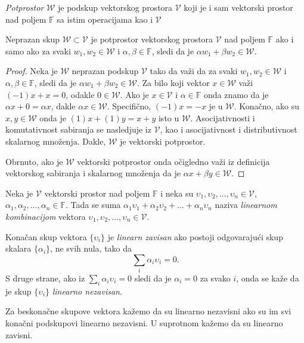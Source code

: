 \documentclass{article}
\begin{document}
\begin{definition}
  \textit{Potprostor} $\mathcal{W}$ je podskup vektorskog prostora $\mathcal{V}$ koji je i sam vektorski prostor nad poljem $\mathbb{F}$ sa istim operacijama kao i $\mathcal{V}$
\end{definition}

\begin{theorem}
  Neprazan skup $\mathcal{W} \subset \mathcal{V}$ je potprostor vektorskog prostora $\mathcal{V}$ nad poljem $\mathbb{F}$ ako i samo ako za svaki $w_1, w_2 \in \mathcal{W}$ i $\alpha, \beta \in \mathbb{F}$, sledi da je $\alpha w_1 + \beta w_2 \in \mathcal{W}$.
\end{theorem}

\begin{proof}
  Neka je $\mathcal{W}$ neprazan podskup $\mathcal{V}$ tako da važi da za svaki $w_1, w_2 \in \mathcal{W}$ i $\alpha, \beta \in \mathbb{F}$, sledi da je $\alpha w_1 + \beta w_2 \in \mathcal{W}$.
  Za bilo koji vektor $x \in \mathcal{W}$ važi $(-1) x + x = 0$, odakle $0 \in \mathcal{W}$.
  Ako je $x \in \mathcal{V}$ i $\alpha \in \mathbb{F}$ onda znamo da je $\alpha x + 0 = \alpha x$, dakle $\alpha x \in \mathcal{W}$.
  Specifično, $(-1) x = -x$ je u $\mathcal{W}$.
  Konačno, ako su $x, y \in \mathcal{W}$ onda je $(1) x + (1) y = x + y$ isto u $\mathcal{W}$.
  Asocijativnosti i komutativnost sabiranja se nasledjuje iz $\mathcal{V}$, kao i asocijativnost i distributivnost skalarnog množenja.
  Dakle, $\mathcal{W}$ je vektorski potprostor.

  Obrnuto, ako je $\mathcal{W}$ vektorski potprostor onda očigledno važi iz definicija vektorskog sabiranja i skalarnog množenja da je $\alpha x + \beta y \in \mathcal{W}$.
\end{proof}

\begin{definition}
  Neka je $\mathcal{V}$ vektorski prostor nad poljem $\mathbb{F}$ i neka su $\upsilon_1, \upsilon_2, \ldots, \upsilon_n \in \mathcal{V}$, $\alpha_1, \alpha_2, \ldots, \alpha_n \in \mathbb{F}$.
  Tada se suma $\alpha_1 \upsilon_1 + \alpha_2 \upsilon_2 + \ldots + \alpha_n \upsilon_n$ naziva \textit{linearnom kombinacijom} vektora $\upsilon_1, \upsilon_2, \ldots, \upsilon_n \in \mathcal{V}$.
\end{definition}

\begin{definition}
  Konačan skup vektora $\{\upsilon_i\}$ je \textit{linearn zavisan} ako postoji odgovarajući skup skalara $\{\alpha_i\}$, ne svih nula, tako da
  \[\sum_{i} \alpha_i \upsilon_i = 0.\]
  S druge strane, ako iz $\sum_{i} \alpha_i \upsilon_i = 0$ sledi da je $\alpha_i = 0$ za svako $i$, onda se kaže da je skup $\{\upsilon_i\}$ \textit{linearno nezavisan}.
  
  Za beskonačne skupove vektora kažemo da su linearno nezavisni ako su im svi konačni podskupovi linearno nezavisni.
  U suprotnom kažemo da su linearno zavisni.
\end{definition}
\end{document}
